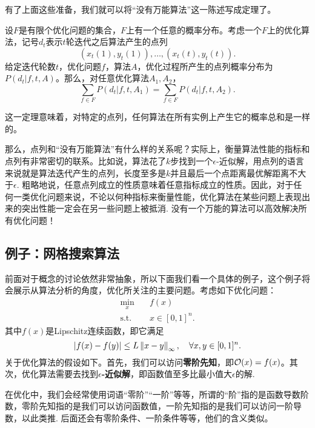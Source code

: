 有了上面这些准备，我们就可以将“没有万能算法”这一陈述写成定理了。

\begin{theorem}[没有免费午餐定理]\label{thm:no-free-lunch}
    设$F$是有限个优化问题的集合，$F$上有一个任意的概率分布。考虑一个$F$上的优化算法，记号$d_t$表示$t$轮迭代之后算法产生的点列
    \[(x_t(1),y_t(1)),\dots,(x_t(t),y_t(t)).\]
    给定迭代轮数$t$，优化问题$f$，算法$A$，优化过程所产生的点列概率分布为$P(d_t|f,t,A)$。那么，对任意优化算法$A_1,A_2$，
    \[\sum_{f\in F} P(d_t|f,t,A_1)=\sum_{f\in F} P(d_t|f,t,A_2).\]
\end{theorem}
这一定理意味着，对特定的点列，任何算法在所有实例上产生它的概率总和是一样的。

那么，点列和“没有万能算法”有什么样的关系呢？实际上，衡量算法性能的指标和点列有非常密切的联系。比如说，算法花了$k$步找到一个$\epsilon$-近似解，用点列的语言来说就是算法迭代产生的点列，长度至多是$k$并且最后一个点距离最优解距离不大于$\epsilon$. 粗略地说，任意点列成立的性质意味着任意指标成立的性质。因此，对于任何一类优化问题来说，不论以何种指标来衡量性能，优化算法在某些问题上表现出来的突出性能一定会在另一些问题上被抵消. 没有一个万能的算法可以高效解决所有优化问题！


\subsection{例子：网格搜索算法}

前面对于概念的讨论依然非常抽象，所以下面我们看一个具体的例子，这个例子将会展示从算法分析的角度，优化所关注的主要问题。考虑如下优化问题：
\begin{equation}
    \begin{aligned}
    \min_{x}&\quad f(x)\\
    \text{s.t.}&\quad x\in[0,1]^n.
\end{aligned}\label{opt:gird-search}
\end{equation}
其中$f(x)$是Lipschitz连续函数，即它满足
    \[|f(x)-f(y)|\leq L\left\|x-y\right\|_\infty,\quad\forall x,y\in[0,1]^n.\]
关于优化算法的假设如下。首先，我们可以访问\textbf{零阶先知}，即$\mathcal{O}(x)=f(x)$。其次，优化算法需要去找到\textbf{$\epsilon$-近似解}，即函数值至多比最小值大$\epsilon$的解.

\begin{remark}
        在优化中，我们会经常使用词语“零阶”“一阶”等等，所谓的“阶”指的是函数导数阶数，零阶先知指的是我们可以访问函数值，一阶先知指的是我们可以访问一阶导数，以此类推. 后面还会有零阶条件、一阶条件等等，他们的含义类似。
\end{remark}

